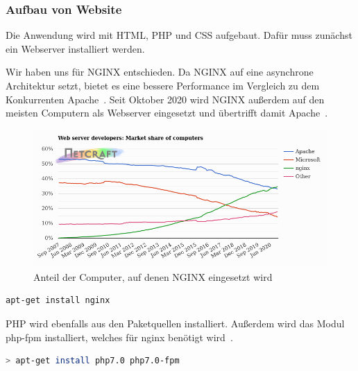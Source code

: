 \subsubsection{Aufbau von Website}
Die Anwendung wird mit HTML, PHP und CSS aufgebaut.
Dafür muss zunächst ein Webserver installiert werden.



Wir haben uns für NGINX entschieden.
Da NGINX auf eine asynchrone Architektur setzt, bietet es eine bessere Performance im Vergleich zu dem Konkurrenten Apache~\cite{NginxVsApache}.
Seit Oktober 2020 wird NGINX außerdem auf den meisten Computern als Webserver eingesetzt und übertrifft damit Apache~\cite{WebServerSurvey}.

\begin{figure}[H]
    \includegraphics[width=1\textwidth]{img/NGINX.png}
    \caption{Anteil der Computer, auf denen NGINX eingesetzt wird~\cite{WebServerSurvey}}\label{fig:figure}
\end{figure}

\newpage
{}

\begin{lstlisting}[language=Bash, caption=Installation von NGINX,label={lst:nginxinstall}]
apt-get install nginx
\end{lstlisting}
\vspace{5mm}


PHP wird ebenfalls aus den Paketquellen installiert.
Außerdem wird das Modul php-fpm installiert, welches für nginx benötigt wird~\cite{InstallNginxPHP}.

\begin{lstlisting}[language=Bash, caption=PHP und PHP-FPM installation,label={lst:installphpphpfpm}]
> apt-get install php7.0 php7.0-fpm
\end{lstlisting}
\vspace{5mm}

